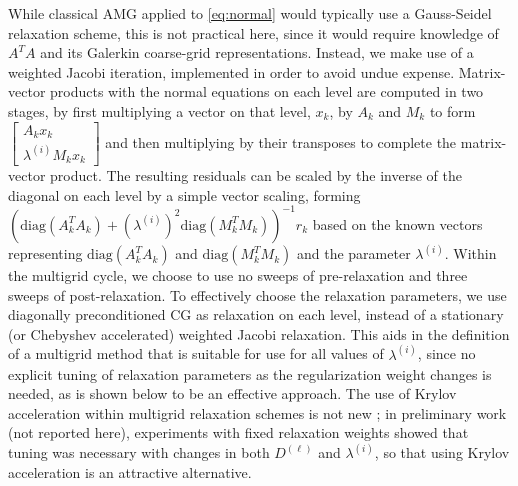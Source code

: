 While classical AMG applied to \eqref{eq:normal} would typically use a
Gauss-Seidel relaxation scheme, this is not practical here, since it
would require knowledge of $A^TA$ and its Galerkin coarse-grid
representations.  Instead, we make use of a weighted Jacobi iteration,
implemented in order to avoid undue expense.  Matrix-vector products
with the normal equations on each level are computed in two stages, by
first multiplying a vector on that level, $x_k$, by $A_k$ and $M_k$ to
form $\left[\begin{smallmatrix}
A_kx_k \\ \lambda^{(i)}M_kx_k \end{smallmatrix}\right]$ and then
multiplying by their transposes to complete the matrix-vector product.
The resulting residuals can be scaled by the inverse of the diagonal
on each level by a simple vector scaling, forming
$\left(\text{diag}(A_k^TA_k)
+ \left(\lambda^{(i)}\right)^2\text{diag}(M_k^TM_k)\right)^{-1}r_k$
based on the known vectors representing $\text{diag}(A_k^TA_k)$ and
$\text{diag}(M_k^TM_k)$ and the parameter $\lambda^{(i)}$.  Within the
multigrid cycle, we choose to use no sweeps of pre-relaxation and
three sweeps of post-relaxation.  To effectively choose the relaxation
parameters, we use diagonally preconditioned CG as relaxation on each
level, instead of a stationary (or Chebyshev accelerated) weighted
Jacobi relaxation.  This aids in the definition of a multigrid method
that is suitable for use for all values of $\lambda^{(i)}$, since no
explicit tuning of relaxation parameters as the regularization weight
changes is needed, as is shown below to be an effective approach.  The
use of Krylov acceleration within multigrid relaxation schemes is not
new \cite{REBank_CCDouglas_1985a, BReps_etal_2010a}; in preliminary
work (not reported here), experiments with fixed relaxation weights
showed that tuning was necessary with changes in both $D^{(\ell)}$ and
$\lambda^{(i)}$, so that using Krylov acceleration is an attractive
alternative.

